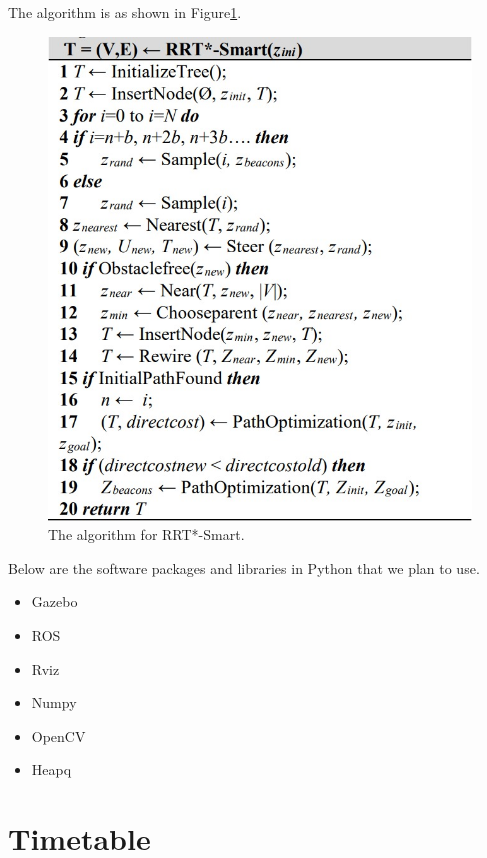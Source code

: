 \documentclass[12pt]{extarticle}
\begin{document}
The algorithm is as shown in Figure\ref{algo}.
\begin{figure}[H]
	\centering
	\includegraphics[scale = 0.5]{pseudocode}
	\caption{The algorithm for RRT*-Smart. \cite{Iram}}\label{algo}
\end{figure}

Below are the software packages and libraries in Python that we plan to use.
\begin{itemize}
	\item Gazebo
	\item ROS
	\item Rviz
	\item Numpy
	\item OpenCV
	\item Heapq
\end{itemize}

\section{Timetable}
\end{document}
